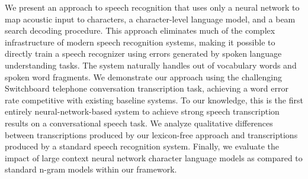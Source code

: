 We present an approach to speech recognition that uses only a neural network to map acoustic input to characters, a character-level language model, and a beam search decoding procedure. This approach eliminates much of the complex infrastructure of modern speech recognition systems, making it possible to directly train a speech recognizer using errors generated by spoken language understanding tasks. The system naturally handles out of vocabulary words and spoken word fragments. We demonstrate our approach using the challenging Switchboard telephone conversation transcription task, achieving a word error rate competitive with existing baseline systems. To our knowledge, this is the first entirely neural-network-based system to achieve strong speech transcription results on a conversational speech task. We analyze qualitative differences between transcriptions produced by our lexicon-free approach and transcriptions produced by a standard speech recognition system. Finally, we evaluate the impact of large context neural network character language models as compared to standard n-gram models within our framework.

